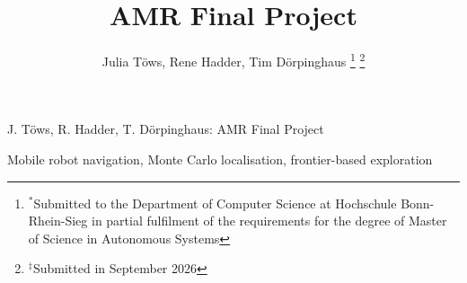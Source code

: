 \documentclass[a4paper,journal]{IEEEtran}
\begin{document}
\title{AMR Final Project}

\author{Julia Töws, Rene Hadder, Tim Dörpinghaus
\thanks{$^*$Submitted to the Department of Computer Science at Hochschule Bonn-Rhein-Sieg in partial fulfilment of the requirements for the degree of Master of Science in Autonomous Systems}
\thanks{$^{\ddagger}$Submitted in September 2026}} %

%
{J. Töws, R. Hadder, T. Dörpinghaus: AMR Final Project}

\maketitle



\begin{IEEEkeywords}
Mobile robot navigation, Monte Carlo localisation, frontier-based exploration
\end{IEEEkeywords}







% 
% 



\end{document}
